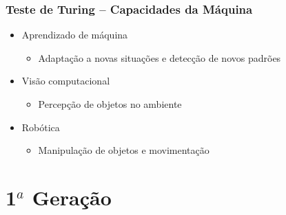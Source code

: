 \documentclass[aspectratio=169,
				xcolor=table]{beamer}
\begin{document}
	\begin{frame}
		\frametitle{Teste de Turing – Capacidades da Máquina}
		\begin{itemize}
			\item Aprendizado de máquina
			\begin{itemize}
				\item Adaptação a novas situações e detecção de novos padrões
			\end{itemize}
			\vspace{1em}
			\item Visão computacional
			\begin{itemize}
				\item Percepção de objetos no ambiente
			\end{itemize}
			\vspace{1em}
			\item Robótica
			\begin{itemize}
				\item Manipulação de objetos e movimentação
			\end{itemize}
		\end{itemize}
	\end{frame}	
	
	\section{1${}^a$ Geração}
	
\end{document}
